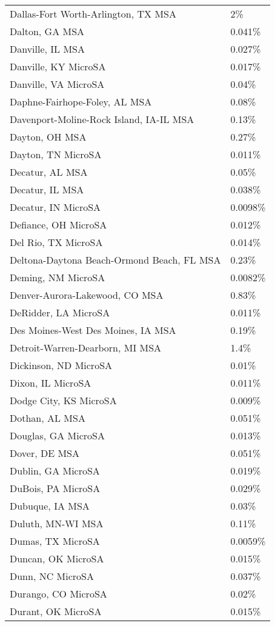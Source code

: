 \begin{longtable}[]{@{}ll@{}}
Dallas-Fort Worth-Arlington, TX MSA & 2\% \\
Dalton, GA MSA & 0.041\% \\
Danville, IL MSA & 0.027\% \\
Danville, KY MicroSA & 0.017\% \\
Danville, VA MicroSA & 0.04\% \\
Daphne-Fairhope-Foley, AL MSA & 0.08\% \\
Davenport-Moline-Rock Island, IA-IL MSA & 0.13\% \\
Dayton, OH MSA & 0.27\% \\
Dayton, TN MicroSA & 0.011\% \\
Decatur, AL MSA & 0.05\% \\
Decatur, IL MSA & 0.038\% \\
Decatur, IN MicroSA & 0.0098\% \\
Defiance, OH MicroSA & 0.012\% \\
Del Rio, TX MicroSA & 0.014\% \\
Deltona-Daytona Beach-Ormond Beach, FL MSA & 0.23\% \\
Deming, NM MicroSA & 0.0082\% \\
Denver-Aurora-Lakewood, CO MSA & 0.83\% \\
DeRidder, LA MicroSA & 0.011\% \\
Des Moines-West Des Moines, IA MSA & 0.19\% \\
Detroit-Warren-Dearborn, MI MSA & 1.4\% \\
Dickinson, ND MicroSA & 0.01\% \\
Dixon, IL MicroSA & 0.011\% \\
Dodge City, KS MicroSA & 0.009\% \\
Dothan, AL MSA & 0.051\% \\
Douglas, GA MicroSA & 0.013\% \\
Dover, DE MSA & 0.051\% \\
Dublin, GA MicroSA & 0.019\% \\
DuBois, PA MicroSA & 0.029\% \\
Dubuque, IA MSA & 0.03\% \\
Duluth, MN-WI MSA & 0.11\% \\
Dumas, TX MicroSA & 0.0059\% \\
Duncan, OK MicroSA & 0.015\% \\
Dunn, NC MicroSA & 0.037\% \\
Durango, CO MicroSA & 0.02\% \\
Durant, OK MicroSA & 0.015\% \\

\end{longtable}
